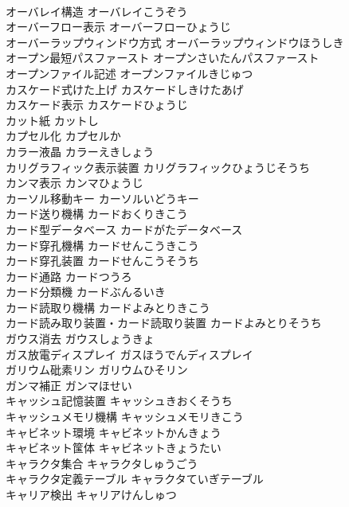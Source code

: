 \documentclass[8pt]{extreport}
\begin{document}
\begin{CJK}{UTF8}{min}
\\	オーバレイ構造	オーバレイこうぞう	
\\	オーバーフロー表示	オーバーフローひょうじ	
\\	オーバーラップウィンドウ方式	オーバーラップウィンドウほうしき	
\\	オープン最短パスファースト	オープンさいたんパスファースト	
\\	オープンファイル記述	オープンファイルきじゅつ	
\\	カスケード式けた上げ	カスケードしきけたあげ	
\\	カスケード表示	カスケードひょうじ	
\\	カット紙	カットし	
\\	カプセル化	カプセルか	
\\	カラー液晶	カラーえきしょう	
\\	カリグラフィック表示装置	カリグラフィックひょうじそうち	
\\	カンマ表示	カンマひょうじ	
\\	カーソル移動キー	カーソルいどうキー	
\\	カード送り機構	カードおくりきこう	
\\	カード型データベース	カードがたデータベース	
\\	カード穿孔機構	カードせんこうきこう	
\\	カード穿孔装置	カードせんこうそうち	
\\	カード通路	カードつうろ	
\\	カード分類機	カードぶんるいき	
\\	カード読取り機構	カードよみとりきこう	
\\	カード読み取り装置・カード読取り装置	カードよみとりそうち	
\\	ガウス消去	ガウスしょうきょ	
\\	ガス放電ディスプレイ	ガスほうでんディスプレイ	
\\	ガリウム砒素リン	ガリウムひそリン	
\\	ガンマ補正	ガンマほせい	
\\	キャッシュ記憶装置	キャッシュきおくそうち	
\\	キャッシュメモリ機構	キャッシュメモリきこう	
\\	キャビネット環境	キャビネットかんきょう	
\\	キャビネット筺体	キャビネットきょうたい	
\\	キャラクタ集合	キャラクタしゅうごう	
\\	キャラクタ定義テーブル	キャラクタていぎテーブル	
\\	キャリア検出	キャリアけんしゅつ	

\end{CJK}
\end{document}
